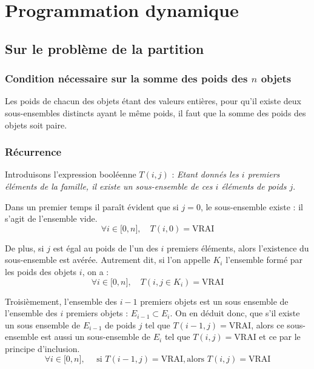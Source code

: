 

\section{Programmation dynamique}

\subsection{Sur le problème de la partition}
\subsubsection{Condition nécessaire sur la somme des poids des $n$ objets}

Les poids de chacun des objets étant des valeurs entières, pour qu'il existe deux sous-ensembles
distincts ayant le même poids, il faut que la somme des poids des objets soit paire.

\subsubsection{Récurrence}

Introduisons l'expression booléenne $T(i,j) $ : \emph{Etant donnés les $i$ premiers éléments de la
famille, il existe un sous-ensemble de ces $i$ éléments de poids $j$}. 

Dans un premier temps il paraît évident que si $j=0$, le sous-ensemble existe : il s'agit de
l'ensemble vide. \begin{equation}
\forall i \in \mathbb{[}0, n \mathbb{]}, \quad T(i,0) = \mbox{VRAI} 
\end{equation}

De plus, si $j$ est égal au poids de l'un des $i$ premiers éléments, alors l'existence du
sous-ensemble est avérée. Autrement dit, si l'on appelle $K_i$ l'ensemble formé par les poids des
objets $i$, on a : \begin{equation}
	\forall i \in \mathbb{[}0, n \mathbb{]}, \quad T(i,j \in K_i) = \mbox{VRAI}
\end{equation}

Troisièmement, l'ensemble des $i-1$ premiers objets est un sous ensemble de l'ensemble des $i$
premiers objets : $E_{i-1} \subset E_i$. On en déduit donc, que s'il existe un sous ensemble de
$E_{i-1}$ de poids $j$ tel que $T(i-1, j) = \mbox{VRAI}$, alors ce sous-ensemble est aussi un
sous-ensemble de $E_i$ tel que $T(i, j) = \mbox{VRAI}$ et ce par le principe d'inclusion.
\begin{equation}
	\forall i \in \mathbb{[}0, n \mathbb{]}, \quad \mbox{ si } T(i-1, j) = \mbox{VRAI}, \mbox{
	alors } T(i,j) = \mbox{VRAI}
\end{equation}

